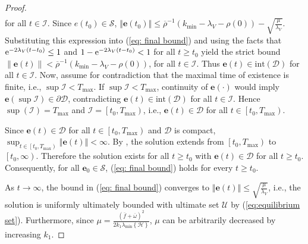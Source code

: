 \documentclass[letterpaper, 10 pt, conference]{ieeeconf}
\theoremstyle{definition}
\begin{document}
\begin{proof}
\begin{equation}
\begin{aligned}
    \end{aligned}
\end{equation}
for all $t\in\mathcal{I}$.
Since $e\left(t_{0}\right)\in\mathcal{S}$, $\left\Vert \mathbf{e}\left(t_{0}\right)\right\Vert \leq\overline{\rho}^{-1}\left(k_{\min}-\lambda_{V}-\rho\left(0\right)\right)-\sqrt{\frac{\mu}{\lambda_{V}}}$.
Substituting this expression into (\ref{eq: final bound}) and using the
facts that ${\rm e}^{-2\lambda_{V}\left(t-t_{0}\right)}\leq1$ and
$1-{\rm e}^{-2\lambda_{V}\left(t-t_{0}\right)}<1$ for all $t\geq t_{0}$
yield the strict bound $\| \mathbf{e}\left(t\right) \| <\overline{\rho}^{-1}\left(k_{\min}-\lambda_{V}-\rho\left(0\right)\right)$, for all $t\in\mathcal{I}$. Thus $\mathbf{e}\left(t\right)\in\text{int}\left(\mathcal{D}\right)$
for all $t\in\mathcal{I}$. Now, assume for contradiction that the
maximal time of existence is finite, i.e., $\sup\mathcal{I}<T_{\max}$.
If $\sup\mathcal{I}<T_{\max}$, continuity of $\mathbf{e}\left(\cdot\right)$
would imply $\mathbf{e}\left(\sup\mathcal{I}\right)\in\partial\mathcal{D}$,
contradicting $\mathbf{e}\left(t\right)\in\text{int}\left(\mathcal{D}\right)$
for all $t\in\mathcal{I}$. Hence $\sup\left(\mathcal{I}\right)=T_{\text{max}}$
and $\mathcal{I}=\left[t_{0},T_{\max}\right)$, i.e., $\mathbf{e}\left(t\right)\in\mathcal{D}$
for all $t\in\left[t_{0},T_{\max}\right)$.

Since $\mathbf{e}\left(t\right)\in\mathcal{D}$ for all $t\in\left[t_{0},T_{\max}\right)$
and $\mathcal{D}$ is compact, $\sup_{t\in\left[t_{0},T_{\max}\right)}\left\Vert \mathbf{e}\left(t\right)\right\Vert <\infty$.
By \cite[Chapter 1, Theorem 4.1]{Coddington.Earl1956}, the
solution extends from $\left[t_{0},T_{\max}\right)$ to $\left[t_{0},\infty\right)$.
Therefore the solution exists for all $t\geq t_{0}$ with $\mathbf{e}\left(t\right)\in\mathcal{D}$
for all $t\geq t_{0}$. Consequently, for all $\mathbf{e}_{0} \in\mathcal{S}$,
(\ref{eq: final bound}) holds for every $t\geq t_{0}$.

As $t\to\infty$, the bound in (\ref{eq: final bound}) converges 
to $\left\Vert \mathbf{e}\left(t\right)\right\Vert \leq\sqrt{\frac{\mu}{\lambda_{V}}}$,
i.e., the solution is uniformly ultimately bounded with ultimate set
$\mathcal{U}$ by (\ref{eq:equilibrium set}). Furthermore, since
$\mu=\frac{\left(\overline{f}+\overline{\omega}\right)^{2}}{2k_{1}\lambda_{\min}\left\{ \mathcal{H}\right\} }$, $\mu$ can be arbitrarily decreased
by increasing $k_{1}$.


\end{proof}
\end{document}
